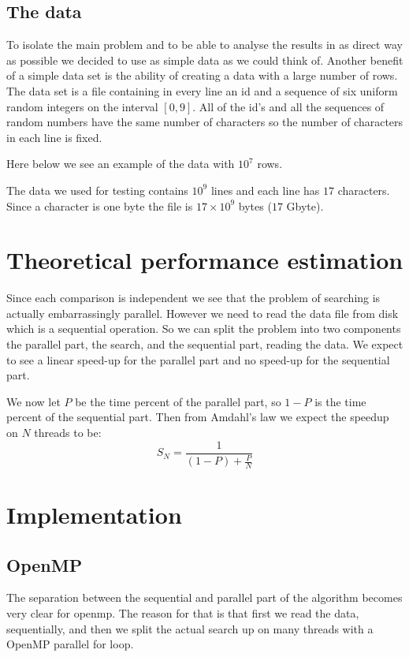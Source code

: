 \documentclass[a4paper,10pt]{article}
\begin{document}
\subsection{The data}
To isolate the main problem and to be able to analyse the results in as direct way as possible we decided to use as simple data as we could think of.
Another benefit of a simple data set is the ability of creating a data with a large number of rows. 
The data set is a file containing in every line an id and a sequence of six uniform random integers on the interval $[0,9]$.  
All of the id's and all the sequences of random numbers have the same number of characters so the number of characters in each line is fixed.

Here below we see an example of the data with $10^7$ rows.
  
The data we used for testing contains $10^{9}$ lines and each line has $17$ characters.  Since a character is one byte
the file is $17 \times 10^9$ bytes ($17$ Gbyte).

\section{Theoretical performance estimation}

Since each comparison is independent we see that the problem of searching is actually 
embarrassingly parallel.  
However we need to read the data file from disk which is a sequential operation.  
So we can split the problem into two components the parallel part, the search,
and the sequential part, reading the data.
We expect to see a linear speed-up for the parallel part and
no speed-up for the sequential part.

We now let $P$ be the time percent of the parallel  
part, so $1-P$ is the time percent of the sequential part.  
Then from Amdahl's law we expect the speedup on $N$ threads to be:
$$ S_N = \frac{1}{(1-P)+\frac{P}{N}}$$

\section{Implementation}
  
\subsection{OpenMP}

  
  The separation between the sequential and parallel part of the algorithm becomes very clear 
  for openmp. The reason for that is that first we read the data, sequentially, and then we
  split the actual search up on many threads with a OpenMP parallel for loop.  
  
\end{document}
